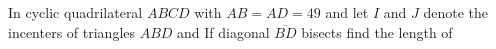 In cyclic quadrilateral $ABCD$ with $AB = AD = 49$ and  let $I$ and $J$ denote the incenters of triangles $ABD$ and  If diagonal $\overline{BD}$ bisects  find the length of 